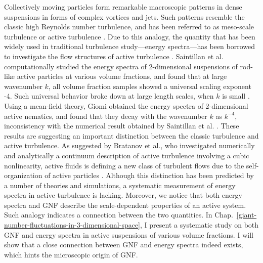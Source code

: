 Collectively moving particles form remarkable macroscopic patterns in dense suspensions in forms of complex vortices and jets. Such patterns resemble the classic high Reynolds number turbulence, and has been referred to as meso-scale turbulence or active turbulence \cite{Wensink2012}. Due to this analogy, the quantity that has been widely used in traditional turbulence study---energy spectra---has been borrowed to investigate the flow structures of active turbulence \cite{Ishikawa2011, Saintillan2012, Bratanov2015, Giomi2015, Bardfalvy2019, Linkmann2019, Chatterjee2019, Skultety2020, Peng2020}. Saintillan et al. computationally studied the energy spectra of 2-dimensional suspensions of rod-like active particles at various volume fractions, and found that at large wavenumber $k$, all volume fraction samples showed a universal scaling exponent -4. Such universal behavior broke down at large length scales, when $k$ is small \cite{Saintillan2012}.
Using a mean-field theory, Giomi obtained the energy spectra of 2-dimensional active nematics, and found that they decay with the wavenumber $k$ as $k^{-4}$, inconsistency with the numerical result obtained by Saintillan et al. \cite{Giomi2015}. These results are suggesting an important distinction between the classic turbulence and active turbulence. As suggested by Bratanov et al., who investigated numerically and analytically a continuum description of active turbulence involving a cubic nonlinearity, active fluids is defining a new class of turbulent flows due to the self-organization of active particles \cite{Bratanov2015}. Although this distinction has been predicted by a number of theories and simulations, a systematic measurement of energy spectra in active turbulence is lacking. Moreover, we notice that both energy spectra and GNF describe the scale-dependent properties of an active system. Such analogy indicates a connection between the two quantities. In Chap.~\ref{giant-number-fluctuations-in-3-dimensional-space}, I present a systematic study on both GNF and energy spectra in active suspensions of various volume fractions. I will show that a close connection between GNF and energy spectra indeed exists, which hints the microscopic origin of GNF.
